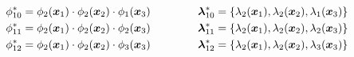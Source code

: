 \documentclass[]{interact}
\theoremstyle{plain}%
\theoremstyle{definition}
\theoremstyle{remark}
\begin{document}
\begin{eqnarray}
%
\phi^{\ast}_{10}= \phi_{2}(\bm{x}_1) \cdot \phi_{2}(\bm{x}_2) \cdot \phi_{1}(\bm{x}_3) \hspace{1.5cm} \bm{\lambda}^{\ast}_{10}= \{\lambda_2(\bm{x}_1), \lambda_2(\bm{x}_2), \lambda_1(\bm{x}_3)\} \nonumber \\
%
\phi^{\ast}_{11}= \phi_{2}(\bm{x}_1) \cdot \phi_{2}(\bm{x}_2) \cdot \phi_{2}(\bm{x}_3) \hspace{1.5cm} \bm{\lambda}^{\ast}_{11}= \{\lambda_2(\bm{x}_1), \lambda_2(\bm{x}_2), \lambda_2(\bm{x}_3)\} \nonumber \\
%
\phi^{\ast}_{12}= \phi_{2}(\bm{x}_1) \cdot \phi_{2}(\bm{x}_2) \cdot \phi_{3}(\bm{x}_3) \hspace{1.5cm} \bm{\lambda}^{\ast}_{12}= \{\lambda_2(\bm{x}_1), \lambda_2(\bm{x}_2), \lambda_3(\bm{x}_3)\} \nonumber
\end{eqnarray}
\end{document}
